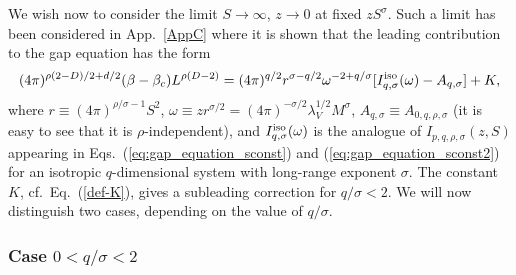 \documentclass[a4paper,12pt]{article}
\begin{document}
We wish now to consider the limit $S\to \infty$, $z\to 0$ at fixed 
$z S^\sigma$. Such a limit has been considered in App.~\ref{AppC} where it 
is shown that the leading contribution to the gap equation has the form
\begin{eqnarray}
(4\pi)^{\rho(2-D)/2+d/2} (\beta-\beta_c) L^{\rho (D-2)} = 
   (4\pi)^{q/2} r^{\sigma - q/2} \omega^{-2+q/\sigma} 
   [I_{q,\sigma}^{\rm iso}(\omega) - A_{q,\sigma}] + K,
\label{gapeq-limitb}
\end{eqnarray}
where 
$r \equiv (4\pi)^{\rho/\sigma-1} S^2$, 
$\omega \equiv z r^{\sigma/2}  = (4 \pi)^{-\sigma/2} \lambda_V^{1/2} M^\sigma$, 
$A_{q,\sigma} \equiv A_{0,q,\rho,\sigma}$ (it is easy to see that it 
is $\rho$-independent), 
and $I_{q,\sigma}^{\rm iso}(\omega)$ is the analogue of 
$I_{p,q,\rho,\sigma}(z,S)$ appearing in 
Eqs.~(\ref{eq:gap_equation_sconst}) and (\ref{eq:gap_equation_sconst2}) 
for an isotropic $q$-dimensional system with long-range exponent $\sigma$.
The constant $K$, cf.~Eq.~(\ref{def-K}),
gives a subleading correction for $q/\sigma< 2$. 
We will now distinguish two cases, depending on the value of 
$q/\sigma$. 

\subsubsection{Case $0<q/\sigma<2$} \label{sec4.2.1}
\end{document}
